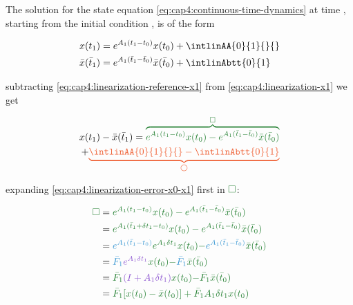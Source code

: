 
The solution for the state equation \eqref{eq:cap4:continuous-time-dynamics} at time , starting from the initial condition , is of the form


\noindent
\begin{align}
	\label{eq:cap4:linearization-x1}
	x(t_1)  &= e^{A_1(t_1-t_0)}x(t_0) + \intlinAA{0}{1}{}{} \\
	\label{eq:cap4:linearization-reference-x1}
	\bar{x}(\bar{t}_1) &= e^{A_1(\bar{t}_1-\bar{t}_0)}\bar{x}(\bar{t}_0) + \intlinAbtt{0}{1}
\end{align}


\noindent
subtracting \eqref{eq:cap4:linearization-reference-x1} from \eqref{eq:cap4:linearization-x1} we get

\noindent
\begin{equation}
	\label{eq:cap4:linearization-error-x0-x1}
	\begin{split}
		x(t_1) - \bar{x}(\bar{t}_1) = \green{\overbrace{e^{A_1(t_1-t_0)}x(t_0) - e^{A_1(\bar{t}_1-\bar{t}_0)}\bar{x}(\bar{t}_0)}^{\square}} \\
		+ \orange{\underbrace{\intlinAA{0}{1}{}{} - \intlinAbtt{0}{1}}_{\bigcirc}}
	\end{split}
\end{equation}

\noindent
expanding \eqref{eq:cap4:linearization-error-x0-x1} first in $\green{\square}$:

\noindent
\begin{align}
	\label{eq:cap4:linearization-error-x0-x1-green-term}
	\green{\square} &= \green{e^{A_1(t_1-t_0)}x(t_0) - e^{A_1(\bar{t}_1-\bar{t}_0)}\bar{x}(\bar{t}_0)} \nonumber \\
				  &= \green{e^{A_1(\bar{t}_1 + \delta t_1 - t_0)}x(t_0) - e^{A_1(\bar{t}_1-\bar{t}_0)}\bar{x}(\bar{t}_0)} \nonumber \\
				  &= \blue{e^{A_1(\bar{t}_1 - t_0)}} \green{e^{A_1 \delta t_1} x(t_0)} \green{-} \blue{e^{A_1(\bar{t}_1-\bar{t}_0)}}\green{\bar{x}(\bar{t}_0)} \nonumber \\
				  &= \blue{\bar{F}_1} \purple{e^{A_1 \delta t_1}} \green{x(t_0)} \green{-} \blue{\bar{F}_1}\green{\bar{x}(\bar{t}_0)} \nonumber \\
				  &= \green{\bar{F}_1} \purple{(I + A_1 \delta t_1)} \green{x(t_0)} \green{-} \green{\bar{F}_1}\green{\bar{x}(\bar{t}_0)} \nonumber \\ 
				  &= \green{\bar{F}_1 [x(t_0) - \bar{x}(t_0)] + \bar{F}_1 A_1 \delta t_1 x(t_0)}
\end{align}

